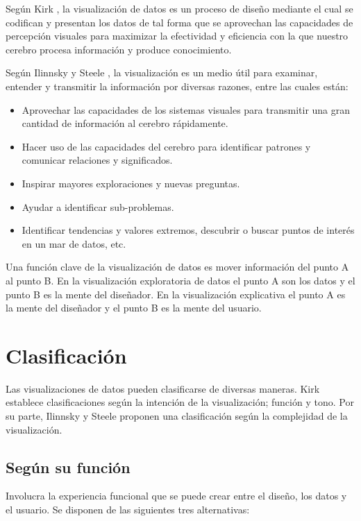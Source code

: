 Según Kirk \cite{Kir12}, la visualización de datos es un proceso de diseño mediante el cual se codifican y presentan los datos de tal forma que se aprovechan las capacidades de percepción visuales para maximizar la efectividad y eficiencia con la que nuestro cerebro procesa información y produce conocimiento.

Según Ilinnsky y Steele \cite{Ste11}, la visualización es un medio útil para examinar, entender y transmitir la información por diversas razones, entre las cuales están:

\begin{itemize}
  \item Aprovechar las capacidades de los sistemas visuales para transmitir una gran cantidad de información al cerebro rápidamente.
  \item Hacer uso de las capacidades del cerebro para identificar patrones y comunicar relaciones y significados.
  \item Inspirar mayores exploraciones y nuevas preguntas.
  \item Ayudar a identificar sub-problemas.
  \item Identificar tendencias y valores extremos, descubrir o buscar puntos de interés en un mar de datos, etc. 
\end{itemize}

Una función clave de la visualización de datos es mover información del punto A al punto B. En la visualización exploratoria de datos el punto A son los datos y el punto B es la mente del diseñador. En la visualización explicativa el punto A es la mente del diseñador y el punto B es la mente del usuario.

\section{Clasificación}
Las visualizaciones de datos pueden clasificarse de diversas maneras. Kirk \cite{Kir12} establece clasificaciones según la intención de la visualización; función y tono. Por su parte, Ilinnsky y Steele \cite{Ste11} proponen una clasificación según la complejidad de la visualización.

\subsection{Según su función}

Involucra la experiencia funcional que se puede crear entre el diseño, los datos y el usuario. Se disponen de las siguientes tres alternativas:

